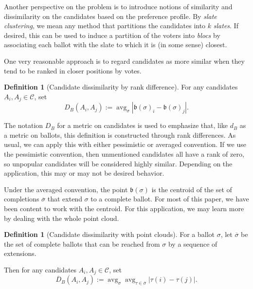 \documentclass{amsart}
\newcommand{\dcand}{D_B}
\newcommand{\dcandbar}{\overline{D}_B}
\newcommand{\bb}{\mathfrak{b}}
\DeclareMathOperator{\avg}{avg}
\theoremstyle{plain}
\theoremstyle{definition}
\newtheorem{definition}[theorem]{Definition}
\theoremstyle{remark}
\newtheorem{remark}[theorem]{Remark}
\begin{document}
Another perspective on the problem is to introduce notions of similarity and dissimilarity on the candidates based on the preference profile.  By \emph{slate clustering}, we mean any method that  partitions the candidates into $k$ \emph{slates}. If desired, this can be used to induce a partition of the voters into {\em blocs} by associating each ballot with the slate to which it is (in some sense) closest. 

One very reasonable approach is to regard candidates as more similar when they tend to be ranked in closer positions by votes.

\begin{definition}[Candidate dissimilarity by rank difference]\label{D:dcand}
For any candidates $A_i,A_j\in \mathcal{C}$,
set $$\dcand(A_i,A_j):= \avg_\sigma \left|\bb(\sigma)_i-\bb(\sigma)_j\right|.$$
\end{definition}

The notation $D_B$ for a metric on candidates is used to emphasize that, like $d_B$ as a metric on ballots, this definition is constructed through rank differences.
As usual, we can apply this with either pessimistic or averaged convention. If we use the pessimistic convention, then unmentioned candidates all have a rank of zero, so unpopular candidates will be considered highly similar.  Depending on the application, this may or may not be desired behavior.

Under the averaged convention, the point $\bb(\sigma)$ is the centroid of the set of completions $\overline{\sigma}$ that extend $\sigma$ to a complete ballot.  For most of this paper, we have been content to work with the centroid.  For this application, we may learn more by dealing with the whole point cloud.

\begin{definition}[Candidate dissimilarity with point clouds]
For a ballot $\sigma$, let $\overline{\sigma}$ be the set of complete ballots that can be reached from $\sigma$ by a sequence of extensions.

Then for any candidates $A_i,A_j\in \mathcal{C}$,
set $$\dcandbar(A_i,A_j):= \avg_\sigma \avg_{\tau\in\overline{\sigma}} 
\left| \tau(i)-\tau(j) \right|.$$
\end{definition}

\end{document}
